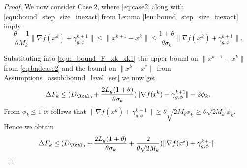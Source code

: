 \documentclass[11pt]{article}
\numberwithin{equation}{section}
\begin{document}
\begin{proof}
	We now consider Case 2, where \eqref{eq:case2} along with \eqref{equ:bound_step_size_inexact} from Lemma  \ref{lem:bound_step_size_inexact} imply
	\begin{equation}\label{eq:bndcase2} 
		\frac{\theta-1}{\theta M_k}\| \nabla f(x^k) + \gamma_{g, \phi}^{k+1} \| \leq \| x^{k+1} -
		 x^k\|\leq \frac{1+\theta}{\theta\sigma_k}\| \nabla f(x^k) + \gamma_{g, \phi}^{k+1} \|.
	\end{equation}

	Substituting into \eqref{equ:_bound_F_xk_xk1} the upper bound on  $\| x^{k+1} - x^k\|$ from \eqref{eq:bndcase2} and the bound on $\|x^{k} - x^*\|$ from Assumptions~\ref{assub:bound_level_set} we now get  
	\begin{align*}
		\Delta F_k\leq 
		(D_{\Xcal_0} + \frac{2L_g(1+\theta)}{\theta\sigma_k})\|\nabla f(x^k)+\gamma_{g, \phi}^{k+1}\| + 2\phi_k.
	\end{align*}
	From $ \phi_k \leq 1$ it follows that $\| \nabla f(x^k) + \gamma_{g, \phi}^{k+1} \| \geq \theta \sqrt{2M_k\phi_k} \geq \theta \sqrt{2M_k}\phi_k$. Hence we obtain
	\begin{align}
	\label{eq:upperbndinexact}
		\Delta F_k\leq 
		(D_{\Xcal_0} + \frac{2L_g(1+\theta)}{\theta\sigma_k} + \frac{2}{\theta\sqrt{2M_k}})\|\nabla f(x^k)+\gamma_{g, \phi}^{k+1}\|.
	\end{align}
	 

\end{proof}
\end{document}
